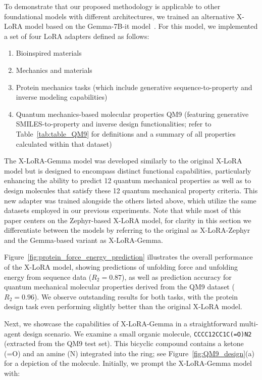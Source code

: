 To demonstrate that our proposed methodology is applicable to other foundational models with different architectures, we trained an alternative X-LoRA model based on the Gemma-7B-it model~\cite{Google/gemma-7b-itFace}. For this model, we implemented a set of four LoRA adapters defined as follows:

\begin{enumerate}
    \item Bioinspired materials \item Mechanics and materials \item Protein mechanics tasks (which include generative sequence-to-property and inverse modeling capabilities) \item Quantum mechanics-based molecular properties QM9 (featuring generative SMILES-to-property and inverse design functionalities; refer to Table~\ref{tab:table_QM9} for definitions and a summary of all properties calculated within that dataset)~\cite{Ruddigkeit2012EnumerationGDB-17,Ramakrishnan2015ElectronicSpace}
\end{enumerate}

The X-LoRA-Gemma model was developed similarly to the original X-LoRA model but is designed to encompass distinct functional capabilities, particularly enhancing the ability to predict 12 quantum mechanical properties as well as to design molecules that satisfy these 12 quantum mechanical property criteria. This new adapter was trained alongside the others listed above, which utilize the same datasets employed in our previous experiments. Note that while most of this paper centers on the Zephyr-based X-LoRA model, for clarity in this section we differentiate between the models by referring to the original as X-LoRA-Zephyr and the Gemma-based variant as X-LoRA-Gemma.

Figure~\ref{fig:protein_force_energy_prediction} illustrates the overall performance of the X-LoRA model, showing predictions of unfolding force and unfolding energy from sequence data ($R_2 = 0.87$), as well as prediction accuracy for quantum mechanical molecular properties derived from the QM9 dataset ($R_2 = 0.96$). We observe outstanding results for both tasks, with the protein design task even performing slightly better than the original X-LoRA model.

Next, we showcase the capabilities of X-LoRA-Gemma in a straightforward multi-agent design scenario. We examine a small organic molecule, \texttt{CCCC12CC1C(=O)N2} (extracted from the QM9 test set). This bicyclic compound contains a ketone (=O) and an amine (N) integrated into the ring; see Figure~\ref{fig:QM9_design}(a) for a depiction of the molecule. Initially, we prompt the X-LoRA-Gemma model with:

